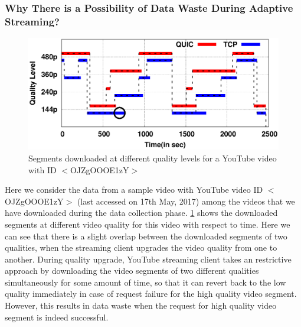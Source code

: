 \subsubsection{Why There is a Possibility of Data Waste During Adaptive Streaming?}


%		
\begin{figure}[!t]
\centering
\includegraphics[width=0.7\linewidth]{img/plotdata/video/plot_timerange}
\caption{Segments downloaded at different quality levels for a YouTube video with ID $<$OJZgOOOE1zY$>$}
\label{fig:plot_timerange}
\end{figure}

Here we consider the data from a sample video with YouTube video ID $<$OJZgOOOE1zY$>$  (last accessed on 17th May, 2017) among the videos that we have downloaded during the data collection phase. \fig\ref{fig:plot_timerange} shows the downloaded segments at different video quality for this video with respect to time. 
Here we can see that there is a slight overlap between the downloaded segments of two qualities, when the streaming client upgrades the video quality from one to another. During quality upgrade, YouTube streaming client takes an restrictive approach by downloading the video segments of two different qualities simultaneously for some amount of time, so that it can revert back to the low quality immediately in case of request failure for the high quality video segment. %
However, this results in data waste when the request for high quality video segment is indeed successful. 

